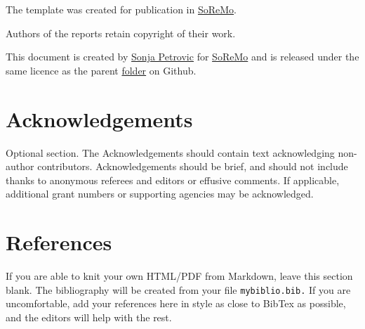 \documentclass[
]{article}
\begin{document}
The template was created for publication in
\href{http://journals.library.iit.edu/index.php/Soremo/}{SoReMo}.

Authors of the reports retain copyright of their work.

This document is created by \href{www.sonjapetrovicstats.com}{Sonja
Petrovic} for \href{www.soremo.org}{SoReMo} and is released under the
same licence as the parent
\href{https://sondzus.github.io/SoReMo/}{folder} on Github.

\hypertarget{acknowledgements}{%
\section{Acknowledgements}\label{acknowledgements}}

Optional section. The Acknowledgements should contain text acknowledging
non-author contributors. Acknowledgements should be brief, and should
not include thanks to anonymous referees and editors or effusive
comments. If applicable, additional grant numbers or supporting agencies
may be acknowledged.

\hypertarget{references}{%
\section{References}\label{references}}

If you are able to knit your own HTML/PDF from Markdown, leave this
section blank. The bibliography will be created from your file
\texttt{mybiblio.bib.} If you are uncomfortable, add your references
here in style as close to BibTex as possible, and the editors will help
with the rest.
\end{document}
